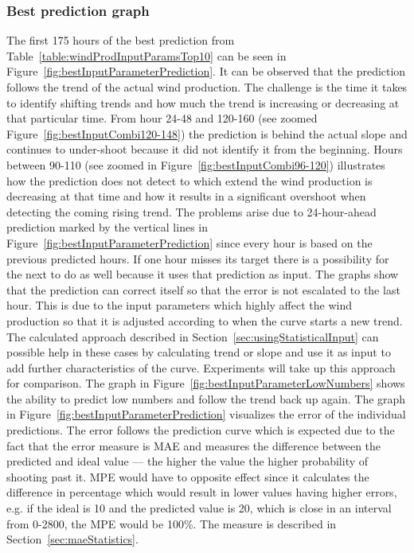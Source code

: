 \subsubsection{Best prediction graph}
\label{sec:bestInputCombiGraph}
The first 175 hours of the best prediction from Table~\ref{table:windProdInputParamsTop10} can be seen in Figure~\ref{fig:bestInputParameterPrediction}. It can be observed that the prediction follows the trend of the actual wind production. The challenge is the time it takes to identify shifting trends and how much the trend is increasing or decreasing at that particular time. From hour 24-48 and 120-160 (see zoomed Figure~\ref{fig:bestInputCombi120-148}) the prediction is behind the actual slope and continues to under-shoot because it did not identify it from the beginning. Hours between 90-110 (see zoomed in Figure~\ref{fig:bestInputCombi96-120}) illustrates how the prediction does not detect to which extend the wind production is decreasing at that time and how it results in a significant overshoot when detecting the coming rising trend. The problems arise due to 24-hour-ahead prediction marked by the vertical lines in Figure~\ref{fig:bestInputParameterPrediction} since every hour is based on the previous predicted hours. If one hour misses its target there is a possibility for the next to do as well because it uses that prediction as input. The graphs show that the prediction can correct itself so that the error is not escalated to the last hour. This is due to the input parameters which highly affect the wind production so that it is adjusted according to when the curve starts a new trend. The calculated approach described in Section~\ref{sec:usingStatisticalInput} can possible help in these cases by calculating trend or slope and use it as input to add further characteristics of the curve. Experiments will take up this approach for comparison. The graph in Figure~\ref{fig:bestInputParameterLowNumbers} shows the ability to predict low numbers and follow the trend back up again. The graph in Figure~\ref{fig:bestInputParameterPrediction} visualizes the error of the individual predictions. The error follows the prediction curve which is expected due to the fact that the error measure is MAE and measures the difference between the predicted and ideal value --- the higher the value the higher probability of shooting past it. MPE would have to opposite effect since it calculates the difference in percentage which would result in lower values having higher errors, e.g. if the ideal is 10 and the predicted value is 20, which is close in an interval from 0-2800, the MPE would be 100\%. The measure is described in Section~\ref{sec:maeStatistics}.

